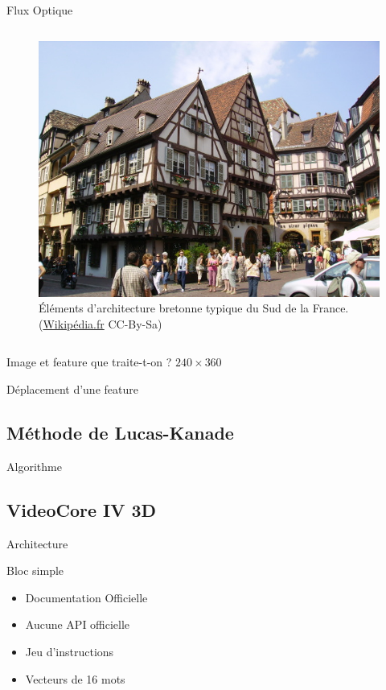 \documentclass{bredelebeamer}
\begin{document}
\begin{frame}{Flux Optique}
\begin{columns}
\begin{column}{0.3\textwidth}
\begin{figure}
\centering
\includegraphics[scale=0.5]{images/architecturebretonne_wikipedia.jpg}
\caption{Éléments d'architecture bretonne typique du Sud de la France. (\href{http://commons.wikimedia.org/wiki/File:Colmar_-_Alsace.jpg}{Wikipédia.fr} CC-By-Sa)}
\end{figure}
\end{column}

\end{columns}

\end{frame}

\begin{frame}{Image et feature}
	que traite-t-on ?
$240\times 360$
\end{frame}

\begin{frame}{Déplacement d'une feature}
\end{frame}


	\subsection{Méthode de Lucas-Kanade}
\begin{frame}{Algorithme}
\end{frame}


	\subsection{VideoCore IV 3D}
\begin{frame}{Architecture}
\begin{block}{Bloc simple}
\begin{itemize}
\item Documentation Officielle
\item Aucune API officielle
\item Jeu d'instructions
\item Vecteurs de 16 mots
\end{itemize}
\end{block}

\end{frame}
\end{document}
